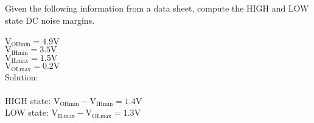 Given the following information from a data sheet, compute the HIGH and LOW state DC noise margins.\\ \\
$\textrm{V}_{\textrm{OHmin}} = 4.9 \textrm{V}$\\
$\textrm{V}_{\textrm{IHmin}} = 3.5 \textrm{V}$\\
$\textrm{V}_{\textrm{ILmax}} = 1.5 \textrm{V}$\\
$\textrm{V}_{\textrm{OLmax}} = 0.2 \textrm{V}$\\

Solution: \\ \\
HIGH state: $\textrm{V}_{\textrm{OHmin}} - \textrm{V}_{\textrm{IHmin}} = 1.4 \textrm{V}$\\
LOW state: $\textrm{V}_{\textrm{ILmax}} - \textrm{V}_{\textrm{OLmax}} = 1.3 \textrm{V}$\\
